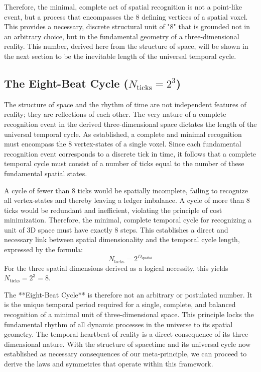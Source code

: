 Therefore, the minimal, complete act of spatial recognition is not a point-like event, but a process that encompasses the 8 defining vertices of a spatial voxel. This provides a necessary, discrete structural unit of "8" that is grounded not in an arbitrary choice, but in the fundamental geometry of a three-dimensional reality. This number, derived here from the structure of space, will be shown in the next section to be the inevitable length of the universal temporal cycle.

\subsection{The Eight-Beat Cycle (\(N_{\text{ticks}}=2^{3}\))}
The structure of space and the rhythm of time are not independent features of reality; they are reflections of each other. The very nature of a complete recognition event in the derived three-dimensional space dictates the length of the universal temporal cycle. As established, a complete and minimal recognition must encompass the 8 vertex-states of a single voxel. Since each fundamental recognition event corresponds to a discrete tick in time, it follows that a complete temporal cycle must consist of a number of ticks equal to the number of these fundamental spatial states.

A cycle of fewer than 8 ticks would be spatially incomplete, failing to recognize all vertex-states and thereby leaving a ledger imbalance. A cycle of more than 8 ticks would be redundant and inefficient, violating the principle of cost minimization. Therefore, the minimal, complete temporal cycle for recognizing a unit of 3D space must have exactly 8 steps. This establishes a direct and necessary link between spatial dimensionality and the temporal cycle length, expressed by the formula:
\begin{equation}
N_{\text{ticks}} = 2^{D_{\text{spatial}}}
\end{equation}
For the three spatial dimensions derived as a logical necessity, this yields \(N_{\text{ticks}} = 2^3 = 8\).

The **Eight-Beat Cycle** is therefore not an arbitrary or postulated number. It is the unique temporal period required for a single, complete, and balanced recognition of a minimal unit of three-dimensional space. This principle locks the fundamental rhythm of all dynamic processes in the universe to its spatial geometry. The temporal heartbeat of reality is a direct consequence of its three-dimensional nature. With the structure of spacetime and its universal cycle now established as necessary consequences of our meta-principle, we can proceed to derive the laws and symmetries that operate within this framework.

